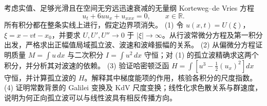 考虑实值、足够光滑且在空间无穷远迅速衰减的无量纲 Korteweg–de Vries 方程
\[
u_t+6uu_x+u_{xxx}=0,\qquad x\in\mathbb R.
\]
所有积分都在整条实线上进行，假定边界项消失。
(1) 令 \(u(x,t)=U(\xi)\)，\(\xi=x-vt-x_0\)，并要求 \(U,U',U''\to0\) 于 \(|\xi|\to\infty\)。从行波常微分方程及第一积分出发，严格求出正幅值局域孤立波、波速和波峰振幅的关系。
(2) 从偏微分方程证明质量 \(M=\int u\,dx\) 与二次积分 \(I=\int u^2\,dx\) 守恒；对 (1) 的孤立波精确求这两个积分，并分析其对波速的依赖。
(3) 验证哈密顿泛函 \(H=\int[u^3-\tfrac12(u_x)^2]dx\) 守恒，并计算孤立波的 \(H\)。解释其中梯度能项的作用，核验各积分的尺度指数。
(4) 证明常数背景的 Galilei 变换及 KdV 尺度变换；线性化求色散关系与群速度，说明为何正向孤立波可以与线性波具有相反传播方向。
